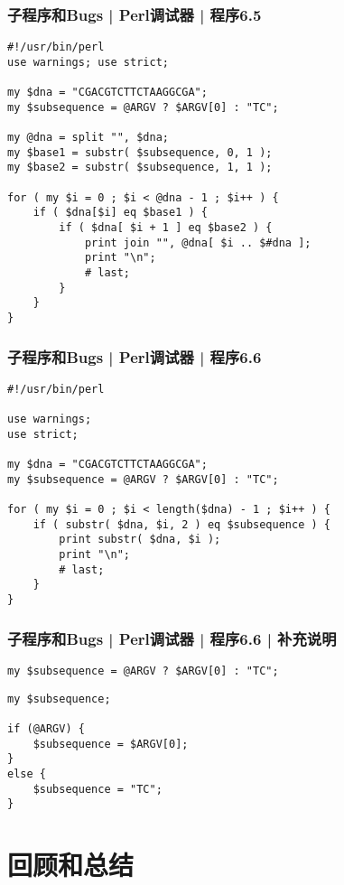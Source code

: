 \begin{frame}[fragile]
  \frametitle{子程序和Bugs | Perl调试器 | 程序6.5}
  \begin{lstlisting}[basicstyle=\footnotesize\tt,numberstyle=\scriptsize]
#!/usr/bin/perl
use warnings; use strict;

my $dna = "CGACGTCTTCTAAGGCGA";
my $subsequence = @ARGV ? $ARGV[0] : "TC";

my @dna = split "", $dna;
my $base1 = substr( $subsequence, 0, 1 );
my $base2 = substr( $subsequence, 1, 1 );

for ( my $i = 0 ; $i < @dna - 1 ; $i++ ) {
    if ( $dna[$i] eq $base1 ) {
        if ( $dna[ $i + 1 ] eq $base2 ) {
            print join "", @dna[ $i .. $#dna ];
            print "\n";
            # last;
        }
    }
}
\end{lstlisting}
\end{frame}

\begin{frame}[fragile]
  \frametitle{子程序和Bugs | Perl调试器 | 程序6.6}
\begin{lstlisting}[basicstyle=\small\tt]
#!/usr/bin/perl

use warnings;
use strict;

my $dna = "CGACGTCTTCTAAGGCGA";
my $subsequence = @ARGV ? $ARGV[0] : "TC";

for ( my $i = 0 ; $i < length($dna) - 1 ; $i++ ) {
    if ( substr( $dna, $i, 2 ) eq $subsequence ) {
        print substr( $dna, $i );
        print "\n";
        # last;
    }
}
\end{lstlisting}
\end{frame}

\begin{frame}[fragile]
  \frametitle{子程序和Bugs | Perl调试器 | 程序6.6 | 补充说明}
\begin{lstlisting}
my $subsequence = @ARGV ? $ARGV[0] : "TC";
\end{lstlisting}
\begin{lstlisting}
my $subsequence;

if (@ARGV) {
    $subsequence = $ARGV[0];
}
else {
    $subsequence = "TC";
}
\end{lstlisting}
\end{frame}

\section{回顾和总结}
